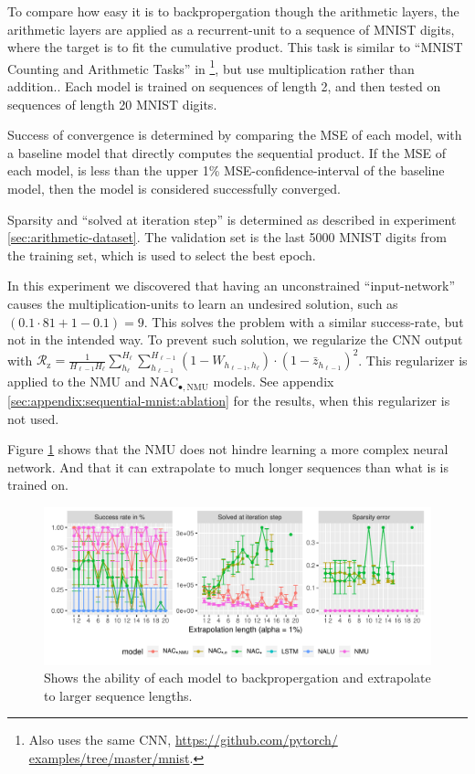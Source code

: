 To compare how easy it is to backpropergation though the arithmetic layers, the arithmetic layers are applied as a recurrent-unit to a sequence of MNIST digits, where the target is to fit the cumulative product. This task is similar to ``MNIST Counting and Arithmetic Tasks'' in \cite{trask-nalu}\footnote{Also uses the same CNN, \url{https://github.com/pytorch/
examples/tree/master/mnist}.}, but use multiplication rather than addition.. Each model is trained on sequences of length 2, and then tested on sequences of length 20 MNIST digits.

Success of convergence is determined by comparing the MSE of each model, with a baseline model that directly computes the sequential product. If the MSE of each model, is less than the upper 1\% MSE-confidence-interval of the baseline model, then the model is considered successfully converged.

Sparsity and ``solved at iteration step'' is determined as described in experiment \ref{sec:arithmetic-dataset}. The validation set is the last 5000 MNIST digits from the training set, which is used to select the best epoch.

In this experiment we discovered that having an unconstrained ``input-network'' causes the multiplication-units to learn an undesired solution, such as $(0.1 \cdot 81 + 1 - 0.1) = 9$. This solves the problem with a similar success-rate, but not in the intended way. To prevent such solution, we regularize the CNN output with $\mathcal{R}_{\mathrm{z}} = \frac{1}{H_{\ell-1} H_\ell} \sum_{h_\ell}^{H_\ell} \sum_{h_{\ell-1}}^{H_{\ell-1}} (1 - W_{h_{\ell-1},h_\ell}) \cdot (1 - \bar{z}_{h_{\ell-1}})^2$. This regularizer is applied to the NMU and $\mathrm{NAC}_{\bullet,\mathrm{NMU}}$ models. See appendix \ref{sec:appendix:sequential-mnist:ablation} for the results, when this regularizer is not used.

Figure \ref{fig:sequential-mnist-prod-results} shows that the NMU does not hindre learning a more complex neural network. And that it can extrapolate to much longer sequences than what is is trained on.

\begin{figure}[h]
\centering
\includegraphics[width=\linewidth,trim={0 0.5cm 0 0},clip]{results/sequential_mnist_prod_long.pdf}
\caption{Shows the ability of each model to backpropergation and extrapolate to larger sequence lengths.} 
\label{fig:sequential-mnist-prod-results}
\end{figure}
